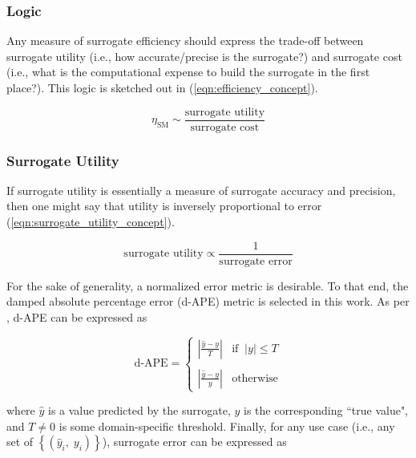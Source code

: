 \documentclass[conference]{IEEEtran}
\begin{document}
\subsubsection{Logic}

Any measure of surrogate efficiency should express the trade-off between surrogate utility (i.e., how accurate/precise is the surrogate?) and surrogate cost (i.e., what is the computational expense to build the surrogate in the first place?). This logic is sketched out in (\ref{eqn:efficiency_concept}).

\begin{equation}
	\eta_\textrm{SM} \sim \frac{\textrm{surrogate utility}}{\textrm{surrogate cost}}
	\label{eqn:efficiency_concept}
\end{equation}

\subsubsection{Surrogate Utility}

If surrogate utility is essentially a measure of surrogate accuracy and precision, then one might say that utility is inversely proportional to error (\ref{eqn:surrogate_utility_concept}).

\begin{equation}
	\textrm{surrogate utility} \propto \frac{1}{\textrm{surrogate error}}
	\label{eqn:surrogate_utility_concept}
\end{equation}

\noindent For the sake of generality, a normalized error metric is desirable. To that end, the damped absolute percentage error (d-APE) metric is selected in this work. As per \cite{Rulff_2024}, d-APE can be expressed as

\begin{equation}
	\textrm{d-APE} = \begin{cases}
		\left|\frac{\widehat{y} - y}{T}\right| & \textrm{if}\;\;|y|\leq T \\
		{} & {} \\
		\left|\frac{\widehat{y} - y}{y}\right| & \textrm{otherwise}
	\end{cases}
	\label{eqn:d-APE}
\end{equation}

\noindent where $\widehat{y}$ is a value predicted by the surrogate, $y$ is the corresponding ``true value", and $T \neq 0$ is some domain-specific threshold. Finally, for any use case (i.e., any set of $\left\{(\widehat{y}_i,\;y_i)\right\}$), surrogate error can be expressed as
\end{document}
